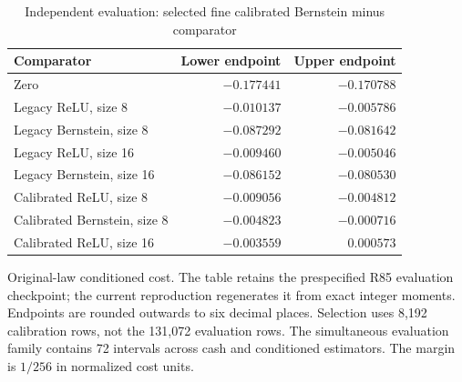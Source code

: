 \begin{table}[htbp]
\centering
\caption{Independent evaluation: selected fine calibrated Bernstein minus comparator}\label{tab:selection86}
\begin{tabular}{lrr}\toprule
Comparator & Lower endpoint & Upper endpoint\\\midrule
Zero & $-0.177441$ & $-0.170788$\\
Legacy ReLU, size 8 & $-0.010137$ & $-0.005786$\\
Legacy Bernstein, size 8 & $-0.087292$ & $-0.081642$\\
Legacy ReLU, size 16 & $-0.009460$ & $-0.005046$\\
Legacy Bernstein, size 16 & $-0.086152$ & $-0.080530$\\
Calibrated ReLU, size 8 & $-0.009056$ & $-0.004812$\\
Calibrated Bernstein, size 8 & $-0.004823$ & $-0.000716$\\
Calibrated ReLU, size 16 & $-0.003559$ & $0.000573$\\\bottomrule
\end{tabular}
\par\smallskip
{\footnotesize Original-law conditioned cost. The table retains the prespecified R85 evaluation checkpoint; the current reproduction regenerates it from exact integer moments. Endpoints are rounded outwards to six decimal places. Selection uses 8,192 calibration rows, not the 131,072 evaluation rows. The simultaneous evaluation family contains 72 intervals across cash and conditioned estimators. The margin is $1/256$ in normalized cost units.}
\end{table}
